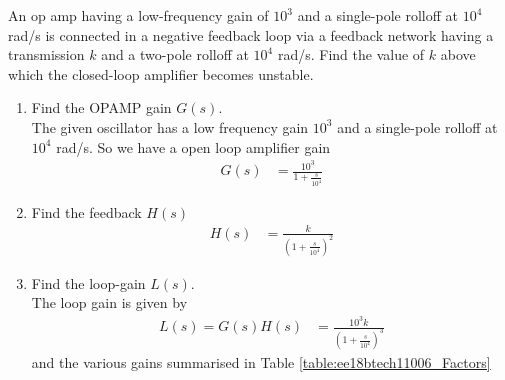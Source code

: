 An op amp having a low-frequency gain of $10^{3}$ and a single-pole rolloff at $10^{4}$ rad/s is connected in a negative feedback loop via a feedback network having a transmission $k$ and a two-pole rolloff at $10^{4}$ rad/s. Find the value of $k$ above which the closed-loop amplifier becomes unstable.
\begin{enumerate}[label=\arabic*.,ref=\theenumi]


\item Find the OPAMP gain $G(s)$.
\\
\solution 
The given oscillator has a low frequency gain $10^3$ and a single-pole rolloff at $10^4$ rad/s. So we have a open loop amplifier gain 
\begin{align}
G(s)&= \frac{10^3}{1+\frac{s}{10^4}}
\end{align}
\item Find the feedback $H(s)$
\\
\solution 
\begin{align}
H(s)&= \frac{k}{\left(1+\frac{s}{10^4}\right)^2}   
\end{align}
%
\item Find the  loop-gain $L(s)$. 
\\
\solution The loop gain is given by 
\begin{align}
L(s) = G(s)H(s) &= \frac{10^3k}{\left(1+\frac{s}{10^4}\right)^3}
\end{align}
and the various gains summarised in Table \ref{table:ee18btech11006_Factors}


\end{enumerate}
